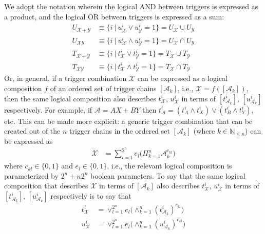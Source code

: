 \\\\
We adopt the notation wherein the logical AND between triggers is expressed as a product, and the logical OR between triggers is expressed as a sum:
\begin{subequations}
\label{eq:composition-set-operations}
\begin{align}
    U_{\mathcal{X}+\mathcal{Y}}&\equiv\{i\ \vert\ u^i_\mathcal{X}\lor u^i_{\mathcal{Y}}=1\}=U_\mathcal{X}\cup U_\mathcal{Y}\\
    U_{\mathcal{XY}}&\equiv\{i\ \vert\ u^i_\mathcal{X}\land u^i_{\mathcal{Y}}=1\}=U_\mathcal{X}\cap U_\mathcal{Y}\\
    T_{\mathcal{X}+\mathcal{Y}}&\equiv\{i\ \vert\ t^i_\mathcal{X}\lor t^i_{\mathcal{Y}}=1\}=T_\mathcal{X}\cup T_\mathcal{Y}\\
    T_{\mathcal{XY}}&\equiv\{i\ \vert\ t^i_\mathcal{X}\land t^i_{\mathcal{Y}}=1\}=T_\mathcal{X}\cap T_\mathcal{Y}
\end{align}
\end{subequations}
Or, in general, if a trigger combination $\mathcal{X}$ can be expressed as a logical composition $f$ of an ordered set of trigger chains $[\mathcal{A}_k]$, i.e., $\mathcal{X}=f([\mathcal{A}_k])$, then the same logical composition also describes $t_\mathcal{X}^i$, $u_\mathcal{X}^i$ in terms of $[t_{\mathcal{A}_k}^i]$, $[u_{\mathcal{A}_k}^i]$ respectively. %
For example, if $\mathcal{A}=AX+BY$ then $t^i_\mathcal{A}=(t^i_A\land t^i_X)\lor (t^i_B\land t^i_Y)$, etc. %
This can be made more explicit: a generic trigger combination that can be created out of the $n$ trigger chains in the ordered set $[\mathcal{A}_k]$ (where $k\in \mathbb{N}_{\leq n}$) can be expressed as
\begin{align}
\mathcal{X}&=\sum_{l=1}^{2^n} e_{l}\bigg(\Pi_{k=1}^{n}\mathcal{A}_k^{c_{kl}}\bigg)
\end{align}
where $c_{kl}\in\{0,1\}$ and $e_l\in\{0,1\}$, i.e., the relevant logical composition is parameterized by $2^n+n2^n$ boolean parameters. To say that the same logical composition that describes $\mathcal{X}$ in terms of $[\mathcal{A}_k]$ also describes $t_\mathcal{X}^i$, $u_\mathcal{X}^i$ in terms of $[t_{\mathcal{A}_k}^i]$, $[u_{\mathcal{A}_k}^i]$ respectively is to say that 
\begin{subequations}
\label{eq:generic-composition-boolean-operations}
\begin{align}
    t_\mathcal{X}^i&=\lor_{l=1}^{2^{n}} e_l\bigg(\land_{k=1}^{n}{(t_{\mathcal{A}_k}^i)}^{c_{kl}}\bigg)\\
    u_\mathcal{X}^i&=\lor_{l=1}^{2^{n}} e_l\bigg(\land_{k=1}^{n}{(u_{\mathcal{A}_k}^i)}^{c_{kl}}\bigg)
\end{align}
\end{subequations}
